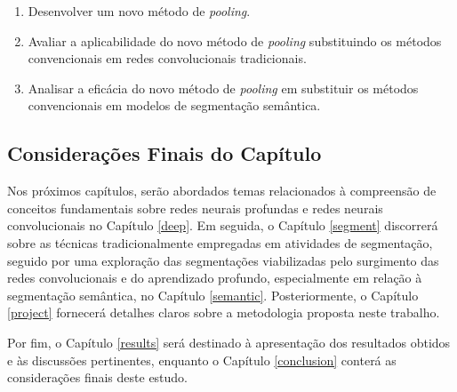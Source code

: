 \begin{enumerate}
    \item Desenvolver um novo método de \textit{pooling}.
    \item Avaliar a aplicabilidade do novo método de \textit{pooling} substituindo os métodos convencionais em redes convolucionais tradicionais.
    \item Analisar a eficácia do novo método de \textit{pooling} em substituir os métodos convencionais em modelos de segmentação semântica.
\end{enumerate}


\subsection{Considerações Finais do Capítulo}
\label{intro:end}
Nos próximos capítulos, serão abordados temas relacionados à compreensão de conceitos fundamentais sobre redes neurais profundas e redes neurais convolucionais no Capítulo \ref{deep}. Em seguida, o Capítulo \ref{segment} discorrerá sobre as técnicas tradicionalmente empregadas em atividades de segmentação, seguido por uma exploração das segmentações viabilizadas pelo surgimento das redes convolucionais e do aprendizado profundo, especialmente em relação à segmentação semântica, no Capítulo \ref{semantic}. Posteriormente, o Capítulo \ref{project} fornecerá detalhes claros sobre a metodologia proposta neste trabalho.

Por fim, o Capítulo \ref{results} será destinado à apresentação dos resultados obtidos e às discussões pertinentes, enquanto o Capítulo \ref{conclusion} conterá as considerações finais deste estudo.
